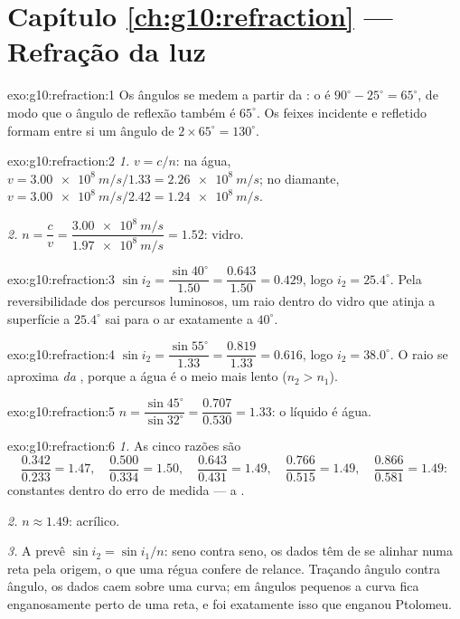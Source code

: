 \section*{Capítulo \ref{ch:g10:refraction} --- Refração da luz}

\begin{solution}{exo:g10:refraction:1}
Os ângulos se medem a partir da : o  é
$90^\circ - 25^\circ = 65^\circ$, de modo que o ângulo de reflexão também
é $65^\circ$. Os feixes incidente e refletido formam entre si um ângulo
de $2 \times 65^\circ = 130^\circ$.
\end{solution}

\begin{solution}{exo:g10:refraction:2}
\emph{1.} $v = c/n$: na água,
$v = \qty{3.00e8}{m/s}/1.33 = \qty{2.26e8}{m/s}$; no diamante,
$v = \qty{3.00e8}{m/s}/2.42 = \qty{1.24e8}{m/s}$.

\emph{2.} $n = \dfrac{c}{v} = \dfrac{\qty{3.00e8}{m/s}}
{\qty{1.97e8}{m/s}} = 1.52$: vidro.
\end{solution}

\begin{solution}{exo:g10:refraction:3}
$\sin i_2 = \dfrac{\sin 40^\circ}{1.50} = \dfrac{0.643}{1.50} = 0.429$,
logo $i_2 = 25.4^\circ$. Pela reversibilidade dos percursos luminosos, um
raio dentro do vidro que atinja a superfície a $25.4^\circ$ sai para o ar
exatamente a $40^\circ$.
\end{solution}

\begin{solution}{exo:g10:refraction:4}
$\sin i_2 = \dfrac{\sin 55^\circ}{1.33} = \dfrac{0.819}{1.33} = 0.616$,
logo $i_2 = 38.0^\circ$. O raio se aproxima \emph{da} , porque a
água é o meio mais lento ($n_2 > n_1$).
\end{solution}

\begin{solution}{exo:g10:refraction:5}
$n = \dfrac{\sin 45^\circ}{\sin 32^\circ} = \dfrac{0.707}{0.530}
= 1.33$: o líquido é água.
\end{solution}

\begin{solution}{exo:g10:refraction:6}
\emph{1.} As cinco razões são
\[
\frac{0.342}{0.233} = 1.47,\quad
\frac{0.500}{0.334} = 1.50,\quad
\frac{0.643}{0.431} = 1.49,\quad
\frac{0.766}{0.515} = 1.49,\quad
\frac{0.866}{0.581} = 1.49 :
\]
constantes dentro do erro de medida --- a .

\emph{2.} $n \approx 1.49$: acrílico.

\emph{3.} A  prevê $\sin i_2 = \sin i_1 / n$: seno contra
seno, os dados têm de se alinhar numa reta pela origem, o que uma régua
confere de relance. Traçando ângulo contra ângulo, os dados caem sobre
uma curva; em ângulos pequenos a curva fica enganosamente perto de uma
reta, e foi exatamente isso que enganou Ptolomeu.
\end{solution}

